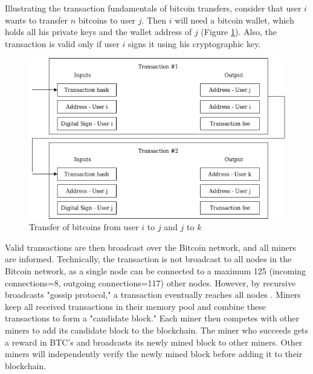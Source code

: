 \documentclass[num-refs]{wiley-article}
\begin{document}
Illustrating the transaction fundamentals of bitcoin transfers, consider that user $i$ wants to transfer $n$ bitcoins to user $j$. Then $i$ will need a bitcoin wallet, which holds all his private keys and the wallet address of $j$ (Figure \ref{bit-transfer}). Also, the transaction is valid only if user $i$ signs it using his cryptographic key. 

\begin{figure}[!h]
\centering\includegraphics[width=\linewidth]{transactions.png}
\caption{Transfer of bitcoins from user $i$ to $j$ and $j$ to $k$}
\label{bit-transfer}
\end{figure}


Valid transactions are then broadcast over the Bitcoin network, and all miners are informed. Technically, the transaction is not broadcast to all nodes in the Bitcoin network, as a single node can be connected to a maximum 125 (incoming connections=8, outgoing connections=117) other nodes. However, by recursive broadcasts "gossip protocol," a transaction eventually reaches all nodes \cite{park2019nodes, monrat2019survey}. Miners keep all received transactions in their memory pool and combine these transactions to form a "candidate block." Each miner then competes with other miners to add its candidate block to the blockchain. The miner who succeeds gets a reward in BTC's and broadcasts its newly mined block to other miners. Other miners will independently verify the newly mined block before adding it to their blockchain. 
\end{document}
